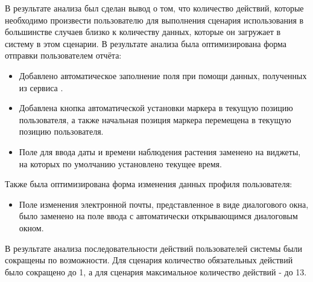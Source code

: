 \tab
В результате анализа был сделан вывод о том, что количество действий, которые необходимо произвести пользователю для выполнения сценария использования в большинстве случаев близко к количеству данных, которые он загружает в систему в этом сценарии.
В результате анализа была оптимизирована форма отправки пользователем отчёта:
\begin{itemize}
	\item Добавлено автоматическое заполнение поля  при помощи данных, полученных из сервиса .
	\item Добавлена кнопка автоматической установки маркера в текущую позицию пользователя, а также начальная позиция маркера перемещена в текущую позицию пользователя.
	\item Поле для ввода даты и времени наблюдения растения заменено на виджеты, на которых по умолчанию установлено текущее время.
\end{itemize}
Также была оптимизирована форма изменения данных профиля пользователя:
\begin{itemize}
	\item Поле изменения электронной почты, представленное в виде диалогового окна, было заменено на поле ввода с автоматически открывающимся диалоговым окном.
\end{itemize}

\tab
В результате анализа последовательности действий пользователей системы были сокращены по возможности.
Для сценария  количество обязательных действий было сокращено до 1, а для сценария  максимальное количество действий - до 13.
